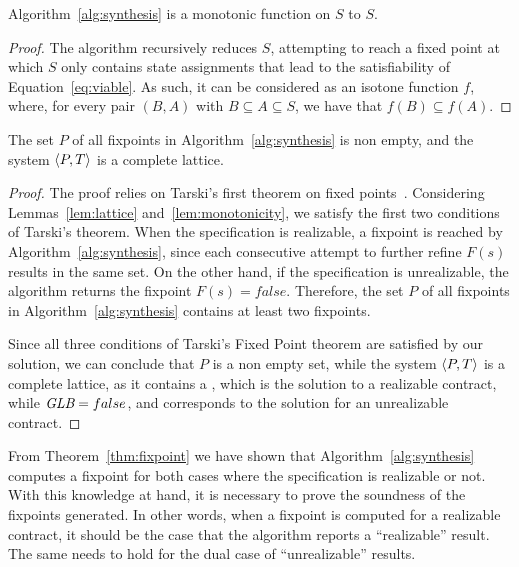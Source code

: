
\begin{lemma} Algorithm~\ref{alg:synthesis} is a monotonic function on $S$ to
$S$.
\label{lem:monotonicity}
\end{lemma}
\begin{proof}
The algorithm recursively reduces $S$, attempting to reach a fixed point
at which $S$ only contains state assignments that lead to the satisfiability of
Equation~\ref{eq:viable}. As such, it can be considered as an isotone function
$f$, where, for every pair $(B,A)$ with $B \subseteq A \subseteq S$, we have that
$f(B) \subseteq f(A)$.
\end{proof}

\begin{theorem}
The set $P$ of all fixpoints in Algorithm~\ref{alg:synthesis} is non
empty, and the system $\langle P, T \rangle$ is a complete lattice.
\label{thm:fixpoint}
\end{theorem}
\begin{proof}
The proof relies on Tarski's first theorem on fixed
points~\cite{tarski1955lattice}.
Considering Lemmas~\ref{lem:lattice} and~\ref{lem:monotonicity}, we satisfy the first two
conditions of Tarski's theorem. When the specification is realizable, a
fixpoint is reached by Algorithm~\ref{alg:synthesis}, since each consecutive
attempt to further refine $F(s)$ results in the same set. On the other hand, if
the specification is unrealizable, the algorithm returns the fixpoint $F(s) = false$. Therefore, the
set $P$ of all fixpoints in Algorithm~\ref{alg:synthesis} contains at least two
fixpoints.

Since all three conditions of Tarski's Fixed Point theorem are satisfied by our
solution, we can conclude that $P$ is a non empty set, while the system
$\langle P, T \rangle$ is a complete lattice, as it contains a \lub, which is
the solution to a realizable contract, while $\textit {GLB} = false$, and corresponds to
the solution for an unrealizable contract.
\end{proof}

From Theorem~\ref{thm:fixpoint} we have shown that Algorithm~\ref{alg:synthesis} computes a fixpoint for both cases where the specification is realizable or not. With this knowledge at hand, it is necessary to prove the soundness of the fixpoints generated. In other words, when a fixpoint is computed for a realizable contract, it should be the case that the algorithm reports a ``realizable'' result. The same needs to hold for the dual case of ``unrealizable'' results.


